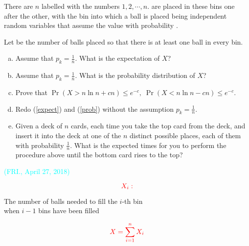 
\begin{frame}{}

  \begin{columns}
  \end{columns}
\end{frame}

\begin{frame}{}
  \begin{exampleblock}{}
    There are $n$  labelled with the numbers $1, 2, \cdots, n$.
     are placed in these bins one after the other,
    with the bin into which a ball is placed being independent random variables
    that assume the value  with probability .

    Let  be the number of balls placed so that there is at least one ball in every bin.
    \begin{enumerate}[(a)]
      \setlength{\itemsep}{5pt}
      \item \label{expect}
	Assume that $p_k = \frac{1}{n}$. What is the expectation of $X$?
      \item \label{prob}
	Assume that $p_k = \frac{1}{n}$. What is the probability distribution of $X$?
      \item Prove that $\Pr(X > n \ln n + cn) \le e^{-c},\; \Pr(X < n \ln n - cn) \le e^{-c}.$
      \item Redo (\ref{expect}) and (\ref{prob}) without the assumption $p_k = \frac{1}{n}$.
      \item Given a deck of $n$ cards, each time you take the top card from the deck,
	and insert it into the deck at one of the $n$ distinct possible places,
	each of them with probability $\frac{1}{n}$.
	What is the expected times for you to perform the procedure above until
	the bottom card rises to the top?
    \end{enumerate}
  \end{exampleblock}
\end{frame}

\begin{frame}{}
  {\vspace{-0.30cm} \centerline{\textcolor{cyan}{\small (FRI., April 27, 2018)}}}

  \[
    \textcolor{red}{X_i:}
  \]
  \begin{center}
    The number of balls needed to fill the $i$-th bin \\
    when $i-1$ bins have been filled
  \end{center}

  \[
    \textcolor{red}{X = \sum_{i=1}^{n} X_i}
  \]
\end{frame}

